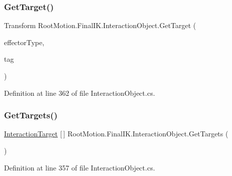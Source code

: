 \subsubsection{\texorpdfstring{Get\+Target()}{GetTarget()}\hspace{0.1cm}{\footnotesize\ttfamily [2/2]}}
{\footnotesize\ttfamily Transform Root\+Motion.\+Final\+I\+K.\+Interaction\+Object.\+Get\+Target (\begin{DoxyParamCaption}\item[{\mbox{\hyperlink{namespace_root_motion_1_1_final_i_k_ae0dd2058c7667b6f132c11a6b860c14a}{Full\+Body\+Biped\+Effector}}}]{effector\+Type,  }\item[{string}]{tag }\end{DoxyParamCaption})}



Definition at line 362 of file Interaction\+Object.\+cs.

\mbox{\label{class_root_motion_1_1_final_i_k_1_1_interaction_object_ae4eab207230e4d8cb7d818e11804ba15}} 
\subsubsection{\texorpdfstring{Get\+Targets()}{GetTargets()}}
{\footnotesize\ttfamily \mbox{\hyperlink{class_root_motion_1_1_final_i_k_1_1_interaction_target}{Interaction\+Target}} \mbox{[}$\,$\mbox{]} Root\+Motion.\+Final\+I\+K.\+Interaction\+Object.\+Get\+Targets (\begin{DoxyParamCaption}{ }\end{DoxyParamCaption})}



Definition at line 357 of file Interaction\+Object.\+cs.

\mbox{\label{class_root_motion_1_1_final_i_k_1_1_interaction_object_a005ae5c3bbe368690cc488272170449d}} 
